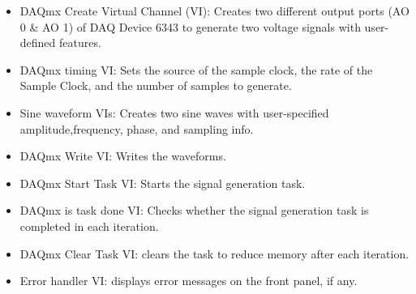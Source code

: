 \documentclass[journal=jacsat,manuscript=article]{achemso}
\begin{document}
\begin{itemize}
	\item DAQmx Create Virtual Channel (VI): Creates two different
	output ports (AO 0 \& AO 1) of DAQ Device 6343 to generate two voltage
	signals with user-defined features.
	\item DAQmx timing VI: Sets the source of the sample clock, the rate of the Sample Clock, and the number of samples to generate.
	\item Sine waveform VIs: Creates two sine waves with user-specified amplitude,frequency, phase, and sampling info.
	\item DAQmx Write VI: Writes the waveforms.
	\item DAQmx Start Task VI: Starts the signal generation task.
	\item DAQmx is task done VI: Checks whether the signal generation task is completed in each iteration. 
	\item DAQmx Clear Task VI: clears the task to reduce memory after each iteration.
	\item Error handler VI: displays error messages on the front panel, if any.
\end{itemize}
\end{document}
